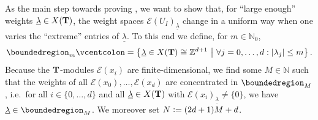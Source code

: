 \documentclass[a4paper, reqno, 10pt]{amsart}
\theoremstyle{definition}
\numberwithin{equation}{section}
\newcommand{\abs}[1]{{\lvert{#1}\rvert}}
\newcommand{\defeq}{\vcentcolon=}
\newcommand{\ul}[1]{{\underline{#1}}}
\let\originalmiddle\middle
\renewcommand{\middle}[1]{\,\originalmiddle#1\,}
\newcommand{\BN}{{\mathbb {N}}}
\newcommand{\BZ}{{\mathbb {Z}}}
\newcommand{\CE}{{\mathcal {E}}}
\newcommand{\bT}{{\mathrm{\bf T}}}
\begin{document}
As the main step towards proving , we want to show that, for ``large enough'' weights $\ul{\lambda}\in X(\bT)$, the weight spaces $\CE(U_I)_\ul{\lambda}$ change in a uniform way when one varies the ``extreme'' entries of $\ul{\lambda}$.
To this end we define, for $m\in \BN_0$,
\begin{equation*}
	\boundedregion_m \defeq \left\{ \ul{\lambda} \in X(\bT) \cong \BZ^{d+1} \middle{|} \forall j=0,\ldots,d: \abs{\lambda_j} \leq m \right\} .
\end{equation*}
Because the $\bT$-modules $\CE(x_i)$ are finite-dimensional, we find some $M \in \BN$ such that the weights of all $\CE(x_0),\ldots,\CE(x_d)$ are concentrated in $\boundedregion_M$, i.e.\ for all $i\in \{0,\ldots,d\}$ and all $\ul{\lambda} \in X(\bT)$ with $\CE(x_i)_\ul{\lambda} \neq \{0\}$, we have $\ul{\lambda} \in \boundedregion_M$.
We moreover set $N \defeq (2d+1)M +d$.
\end{document}
